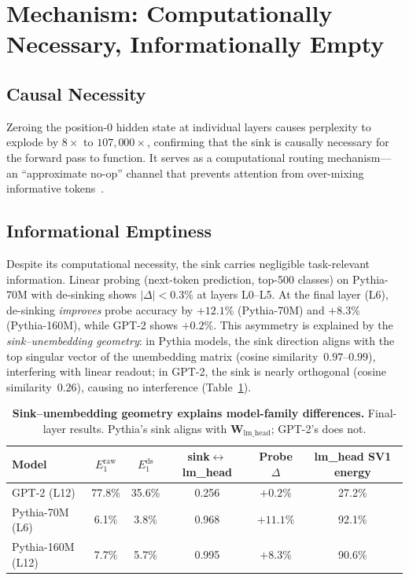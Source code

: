 \documentclass[11pt]{article}
\begin{document}
\section{Mechanism: Computationally Necessary, Informationally Empty}\label{sec:mechanism}

\subsection{Causal Necessity}

Zeroing the position-0 hidden state at individual layers causes perplexity to explode by $8\times$ to $107{,}000\times$, confirming that the sink is causally necessary for the forward pass to function. It serves as a computational routing mechanism---an ``approximate no-op'' channel that prevents attention from over-mixing informative tokens~\citep{barbero2025round}.

\subsection{Informational Emptiness}

Despite its computational necessity, the sink carries negligible task-relevant information. Linear probing (next-token prediction, top-500 classes) on Pythia-70M with de-sinking shows $|\Delta| < 0.3\%$ at layers L0--L5. At the final layer (L6), de-sinking \emph{improves} probe accuracy by $+12.1\%$ (Pythia-70M) and $+8.3\%$ (Pythia-160M), while GPT-2 shows $+0.2\%$. This asymmetry is explained by the \emph{sink--unembedding geometry}: in Pythia models, the sink direction aligns with the top singular vector of the unembedding matrix (cosine similarity~$0.97$--$0.99$), interfering with linear readout; in GPT-2, the sink is nearly orthogonal (cosine similarity~$0.26$), causing no interference (Table~\ref{tab:c1}).

\begin{table}[t]
\centering
\caption{\textbf{Sink--unembedding geometry explains model-family differences.} Final-layer results. Pythia's sink aligns with $\mathbf{W}_{\text{lm\_head}}$; GPT-2's does not.}
\label{tab:c1}
\small
\begin{tabular}{@{}lccccc@{}}
\toprule
\textbf{Model} & \textbf{$E_1^{\text{raw}}$} & \textbf{$E_1^{\text{ds}}$} & \textbf{sink$\leftrightarrow$lm\_head} & \textbf{Probe $\Delta$} & \textbf{lm\_head SV1 energy} \\
\midrule
GPT-2 (L12) & 77.8\% & 35.6\% & 0.256 & $+0.2\%$ & 27.2\% \\
Pythia-70M (L6) & 6.1\% & 3.8\% & 0.968 & $+11.1\%$ & 92.1\% \\
Pythia-160M (L12) & 7.7\% & 5.7\% & 0.995 & $+8.3\%$ & 90.6\% \\
\bottomrule
\end{tabular}
\end{table}
\end{document}
